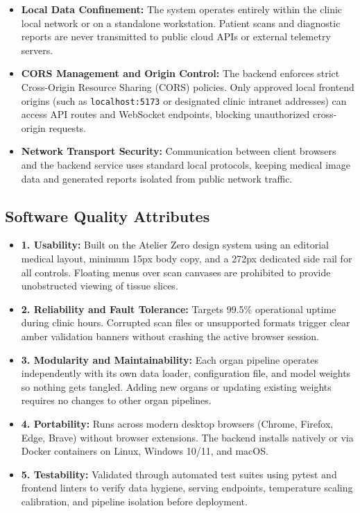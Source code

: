 \documentclass[12pt,a4paper]{report}
\begin{document}
\begin{itemize}[leftmargin=1.2em]
    \item \textbf{Local Data Confinement:} The system operates entirely within the clinic local network or on a standalone workstation. Patient scans and diagnostic reports are never transmitted to public cloud APIs or external telemetry servers.
    \item \textbf{CORS Management and Origin Control:} The backend enforces strict Cross-Origin Resource Sharing (CORS) policies. Only approved local frontend origins (such as \texttt{localhost:5173} or designated clinic intranet addresses) can access API routes and WebSocket endpoints, blocking unauthorized cross-origin requests.
    \item \textbf{Network Transport Security:} Communication between client browsers and the backend service uses standard local protocols, keeping medical image data and generated reports isolated from public network traffic.
\end{itemize}

\subsection{Software Quality Attributes}
\begin{itemize}[leftmargin=1.2em]
    \item \textbf{1. Usability:} Built on the Atelier Zero design system using an editorial medical layout, minimum 15px body copy, and a 272px dedicated side rail for all controls. Floating menus over scan canvases are prohibited to provide unobstructed viewing of tissue slices.
    \item \textbf{2. Reliability and Fault Tolerance:} Targets 99.5\% operational uptime during clinic hours. Corrupted scan files or unsupported formats trigger clear amber validation banners without crashing the active browser session.
    \item \textbf{3. Modularity and Maintainability:} Each organ pipeline operates independently with its own data loader, configuration file, and model weights so nothing gets tangled. Adding new organs or updating existing weights requires no changes to other organ pipelines.
    \item \textbf{4. Portability:} Runs across modern desktop browsers (Chrome, Firefox, Edge, Brave) without browser extensions. The backend installs natively or via Docker containers on Linux, Windows 10/11, and macOS.
    \item \textbf{5. Testability:} Validated through automated test suites using pytest and frontend linters to verify data hygiene, serving endpoints, temperature scaling calibration, and pipeline isolation before deployment.
\end{itemize}
\end{document}
